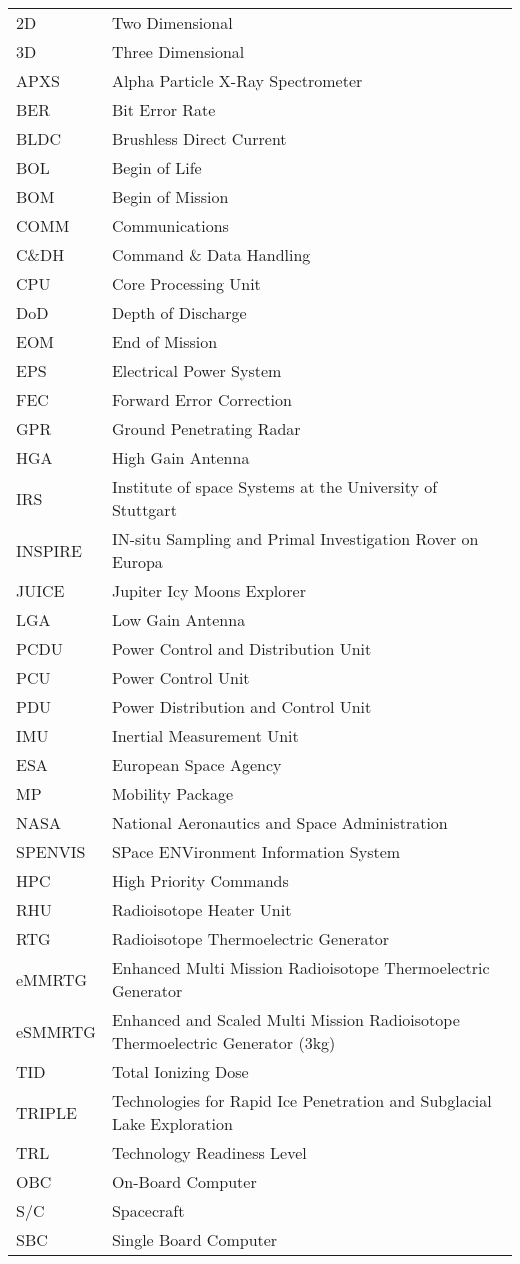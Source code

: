 \begin{longtable}[l]{ll}

2D		& Two Dimensional \\
3D		& Three Dimensional \\
APXS	& Alpha Particle X-Ray Spectrometer \\
BER		& Bit Error Rate \\
BLDC	& Brushless Direct Current	\\
BOL     & Begin of Life \\
BOM     & Begin of Mission \\
COMM    & Communications \\
C\&DH	& Command \& Data Handling \\
CPU		& Core Processing Unit \\
DoD     & Depth of Discharge \\
EOM     & End of Mission \\
EPS     & Electrical Power System \\
FEC		& Forward Error Correction \\
GPR		& Ground Penetrating Radar \\
HGA	    & High Gain Antenna \\
IRS     & Institute of space Systems at the University of Stuttgart \\
INSPIRE & IN-situ Sampling and Primal Investigation Rover on Europa \\
JUICE 	& Jupiter Icy Moons Explorer \\
LGA		& Low Gain Antenna \\		
PCDU    & Power Control and Distribution Unit \\
PCU     & Power Control Unit \\
PDU     & Power Distribution and Control Unit \\
IMU     & Inertial Measurement Unit \\
ESA		& European Space Agency	\\
MP		& Mobility Package \\
NASA    &   National Aeronautics and Space Administration \\
SPENVIS	&	SPace ENVironment Information System	\\
HPC     & High Priority Commands \\
RHU		& Radioisotope Heater Unit\\
RTG     & Radioisotope Thermoelectric Generator \\
eMMRTG  & Enhanced Multi Mission Radioisotope Thermoelectric Generator \\
eSMMRTG & Enhanced and Scaled Multi Mission Radioisotope Thermoelectric Generator (3kg) \\
TID		& Total Ionizing Dose \\
TRIPLE 	& Technologies for Rapid Ice Penetration and Subglacial Lake Exploration \\
TRL     & Technology Readiness Level \\
OBC		& On-Board Computer \\
S/C     & Spacecraft\\
SBC		& Single Board Computer \\




\end{longtable}
